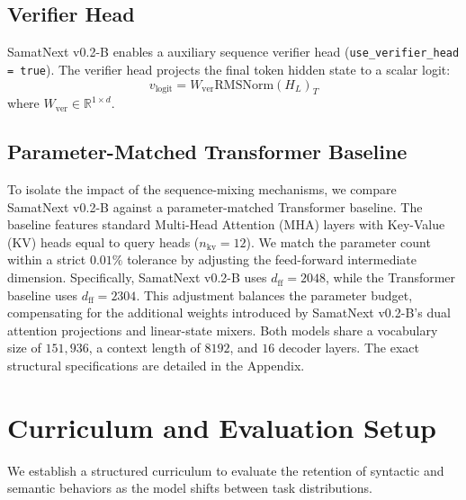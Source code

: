 \documentclass[11pt,a4paper]{article}
\begin{document}
\subsection{Verifier Head}
SamatNext v0.2-B enables a auxiliary sequence verifier head (\texttt{use\_verifier\_head = true}). The verifier head projects the final token hidden state to a scalar logit:
\begin{equation}
    v_{\text{logit}} = W_{\text{ver}} \text{RMSNorm}(H_L)_{T}
\end{equation}
where $W_{\text{ver}} \in \mathbb{R}^{1 \times d}$.

\subsection{Parameter-Matched Transformer Baseline}
To isolate the impact of the sequence-mixing mechanisms, we compare SamatNext v0.2-B against a parameter-matched Transformer baseline. The baseline features standard Multi-Head Attention (MHA) layers with Key-Value (KV) heads equal to query heads ($n_{\mathrm{kv}} = 12$). We match the parameter count within a strict $0.01\%$ tolerance by adjusting the feed-forward intermediate dimension. Specifically, SamatNext v0.2-B uses $d_{\text{ff}} = 2048$, while the Transformer baseline uses $d_{\text{ff}} = 2304$. This adjustment balances the parameter budget, compensating for the additional weights introduced by SamatNext v0.2-B's dual attention projections and linear-state mixers. Both models share a vocabulary size of $151,936$, a context length of $8192$, and $16$ decoder layers. The exact structural specifications are detailed in the Appendix.

\section{Curriculum and Evaluation Setup}
We establish a structured curriculum to evaluate the retention of syntactic and semantic behaviors as the model shifts between task distributions.
\end{document}
